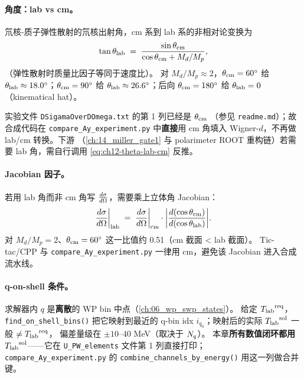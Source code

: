 \paragraph{角度：lab vs cm。}
氘核-质子弹性散射的氘核出射角，cm 系到 lab 系的非相对论变换为
\begin{equation}
\label{eq:ch12-theta-lab-cm}
\tan\theta_{\rm lab} \;=\; \frac{\sin\theta_{\rm cm}}{\cos\theta_{\rm cm} + M_d/M_p},
\end{equation}
（弹性散射时质量比因子等同于速度比）。
对 \(M_d/M_p \approx 2\)，\(\theta_{\rm cm} = 60^\circ\) 给
\(\theta_{\rm lab} \approx 18.0^\circ\)；\(\theta_{\rm cm} = 90^\circ\) 给
\(\theta_{\rm lab} \approx 26.6^\circ\)；后向 \(\theta_{\rm cm} = 180^\circ\) 给
\(\theta_{\rm lab} = 0\)（kinematical hat）。

实验文件 \texttt{DSigamaOverDOmega.txt} 的第 1 列已经是 \(\theta_{\rm cm}\)
（参见 \texttt{readme.md}）；故合成代码在 \texttt{compare\_Ay\_experiment.py}
中\textbf{直接}用 cm 角填入 Wigner-\(d\)，不再做 lab/cm 转换。下游
（\cref{ch:14_miller_gate1} 与 polarimeter ROOT 重构链）若需要 lab
角，需自行调用 \cref{eq:ch12-theta-lab-cm} 反推。

\paragraph{Jacobian 因子。}
若用 lab 角而非 cm 角写 \(\frac{d\sigma}{d\Omega}\)，需要乘上立体角 Jacobian：
\begin{equation}
\label{eq:ch12-jacobian}
\frac{d\sigma}{d\Omega}\bigg|_{\rm lab} \;=\;
\frac{d\sigma}{d\Omega}\bigg|_{\rm cm} \cdot
\bigg|\frac{d(\cos\theta_{\rm cm})}{d(\cos\theta_{\rm lab})}\bigg|.
\end{equation}
对 \(M_d/M_p = 2\)、\(\theta_{\rm cm} = 60^\circ\) 这一比值约 0.51（cm 截面 < lab 截面）。
Tic-tac/CPP 与 \texttt{compare\_Ay\_experiment.py} 一律用 cm，避免该 Jacobian
进入合成流水线。

\paragraph{q-on-shell 条件。}
求解器内 \(q\) 是\textbf{离散}的 WP bin 中点（\cref{ch:06_wp_swp_states}）。
给定 \({T_{\text{lab}}}^{\rm req}\)，\texttt{find\_on\_shell\_bins()} 把它映射到最近的
q-bin idx \(i_{q_0}\)；映射后的实际 \({T_{\text{lab}}}^{\rm sol}\) 一般 \(\neq {T_{\text{lab}}}^{\rm req}\)，
偏差量级在 \(\pm 10\)--\(40\) MeV（取决于 \(N_q\)）。
本章\textbf{所有数值闭环都用 \({T_{\text{lab}}}^{\rm sol}\)}——它在
\texttt{U\_PW\_elements} 文件第 1 列直接打印；\texttt{compare\_Ay\_experiment.py}
的 \texttt{combine\_channels\_by\_energy()} 用这一列做合并键。

